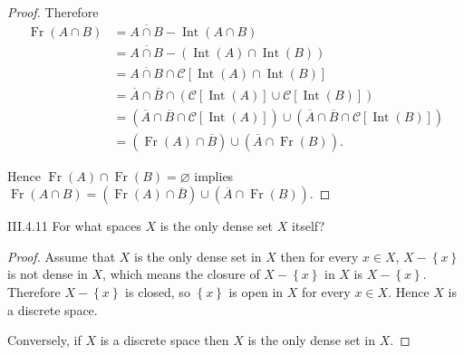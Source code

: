 \begin{proof}
	Therefore
	\begingroup
	\allowdisplaybreaks%
	\begin{align*}
		\operatorname{Fr}(A \cap B) & = \overline{A \cap B} - \operatorname{Int}(A \cap B)                                                                                                                                                         \\
		                            & = \overline{A \cap B} - (\operatorname{Int}(A) \cap \operatorname{Int}(B))                                                                                                                                   \\
		                            & = \overline{A \cap B} \cap \mathscr{C}\left[ \operatorname{Int}(A) \cap \operatorname{Int}(B) \right]                                                                                                        \\
		                            & = \overline{A} \cap \overline{B} \cap \left( \mathscr{C}\left[ \operatorname{Int}(A) \right] \cup \mathscr{C}\left[ \operatorname{Int}(B) \right] \right)                                                    \\
		                            & = \left( \overline{A} \cap \overline{B} \cap \mathscr{C}\left[ \operatorname{Int}(A) \right] \right) \cup \left( \overline{A} \cap \overline{B} \cap \mathscr{C}\left[ \operatorname{Int}(B) \right] \right) \\
		                            & = \left( \operatorname{Fr}(A) \cap \overline{B} \right) \cup \left( \overline{A} \cap \operatorname{Fr}(B) \right).
	\end{align*}
	\endgroup

	Hence \( \operatorname{Fr}(A) \cap \operatorname{Fr}(B) = \varnothing \) implies \( \operatorname{Fr}(A \cap B) = \left( \operatorname{Fr}(A) \cap \overline{B} \right) \cup \left( \overline{A} \cap \operatorname{Fr}(B) \right) \).
\end{proof}

\begin{problem}{III.4.11}
For what spaces \(X\) is the only dense set \(X\) itself?
\end{problem}

\begin{proof}
	Assume that \(X\) is the only dense set in \(X\) then for every \( x \in X \), \( X - \left\{ x \right\} \) is not dense in \( X \), which means the closure of \( X - \left\{ x \right\} \) in \(X\) is \( X - \left\{x\right\} \). Therefore \( X - \left\{x\right\} \) is closed, so \( \left\{ x \right\} \) is open in \(X\) for every \(x\in X\). Hence \(X\) is a discrete space.

	Conversely, if \(X\) is a discrete space then \(X\) is the only dense set in \(X\).
\end{proof}

